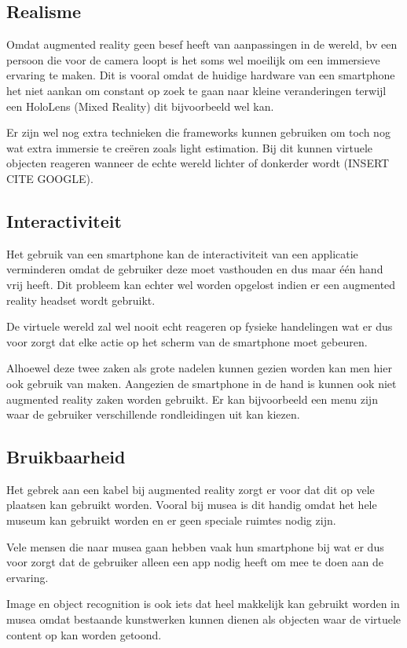 \subsection{Realisme}
Omdat augmented reality geen besef heeft van aanpassingen in de wereld, bv een persoon die voor de camera loopt is het soms wel moeilijk om een immersieve ervaring te maken. Dit is vooral omdat de huidige hardware van een smartphone het niet aankan om constant op zoek te gaan naar kleine veranderingen terwijl een HoloLens (Mixed Reality) dit bijvoorbeeld wel kan.

Er zijn wel nog extra technieken die frameworks kunnen gebruiken om toch nog wat extra immersie te creëren zoals light estimation. Bij dit kunnen virtuele objecten reageren wanneer de echte wereld lichter of donkerder wordt (INSERT CITE GOOGLE).

\subsection{Interactiviteit}
Het gebruik van een smartphone kan de interactiviteit van een applicatie verminderen omdat de gebruiker deze moet vasthouden en dus maar één hand vrij heeft. Dit probleem kan echter wel worden opgelost indien er een augmented reality headset wordt gebruikt.

De virtuele wereld zal wel nooit echt reageren op fysieke handelingen wat er dus voor zorgt dat elke actie op het scherm van de smartphone moet gebeuren.

Alhoewel deze twee zaken als grote nadelen kunnen gezien worden kan men hier ook gebruik van maken. Aangezien de smartphone in de hand is kunnen ook niet augmented reality zaken worden gebruikt. Er kan bijvoorbeeld een menu zijn waar de gebruiker verschillende rondleidingen uit kan kiezen.

\subsection{Bruikbaarheid}
Het gebrek aan een kabel bij augmented reality zorgt er voor dat dit op vele plaatsen kan gebruikt worden. Vooral bij musea is dit handig omdat het hele museum kan gebruikt worden en er geen speciale ruimtes nodig zijn.

Vele mensen die naar musea gaan hebben vaak hun smartphone bij wat er dus voor zorgt dat de gebruiker alleen een app nodig heeft om mee te doen aan de ervaring.

Image en object recognition is ook iets dat heel makkelijk kan gebruikt worden in musea omdat bestaande kunstwerken kunnen dienen als objecten waar de virtuele content op kan worden getoond.

